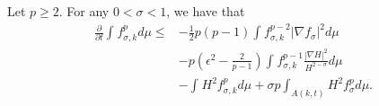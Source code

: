\begin{lemma}
    Let $p \geq 2$. For any $0<\sigma <1 $, we have that 
    \begin{equation}
        \begin{split}
            \frac{\partial }{\partial t}\int_{}^{}f_{\sigma,k }^{p} d \mu 
        \leq&  -\frac{1}{2} p(p-1) \int_{}^{} f_{\sigma ,k}^{p-2} \left| \nabla f_{\sigma }^{}  \right| ^2 d \mu\\
        & -p\left( \epsilon ^2-\frac{2}{p-1} \right)\int_{}^{} f_{\sigma ,k}^{p-1} \frac{\left| \nabla H \right| ^2}{H^{2-\sigma }} d \mu  \\
        & - \int_{}^{}H^2 f_{\sigma,k }^{p} d \mu +\sigma p \int_{A(k,t)}^{} H ^2  f_{\sigma }^{p} d \mu .
        \end{split}
        \end{equation} 
\end{lemma}

